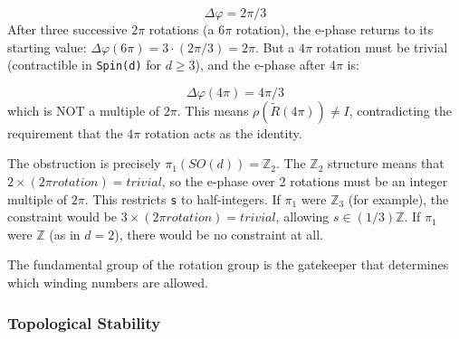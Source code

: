 \documentclass[aps,prd,preprint,superscriptaddress,longbibliography,floatfix]{revtex4-2}
\theoremstyle{remark}
\begin{document}
\begin{equation}
    \Delta\varphi = 2\pi/3
\end{equation}
After three successive $2\pi$ rotations (a $6\pi$ rotation), the e-phase returns to its starting value: $\Delta\varphi(6\pi) = 3\cdot(2\pi/3) = 2\pi$. But a $4\pi$ rotation must be trivial (contractible in \texttt{Spin(d)} for $d \geq 3$), and the e-phase after $4\pi$ is:


\begin{equation}
    \Delta\varphi(4\pi) = 4\pi/3
\end{equation}
which is NOT a multiple of $2\pi$. This means $\rho(\tilde{R}(4\pi)) \neq I$, contradicting the requirement that the $4\pi$ rotation acts as the identity.

The obstruction is precisely $\pi_{1}(SO(d)) = \mathbb{Z}_{2}$. The $\mathbb{Z}_{2}$ structure means that $2 \times (2\pi rotation) = trivial$, so the e-phase over 2 rotations must be an integer multiple of $2\pi$. This restricts \texttt{s} to half-integers. If $\pi_{1}$ were $\mathbb{Z}_{3}$ (for example), the constraint would be $3 \times (2\pi rotation) = trivial$, allowing $s \in (1/3)\mathbb{Z}$. If $\pi_{1}$ were \texttt{$\mathbb{Z}$} (as in $d = 2$), there would be no constraint at all.

The fundamental group of the rotation group is the gatekeeper that determines which winding numbers are allowed.


\subsubsection{Topological Stability}
\end{document}
